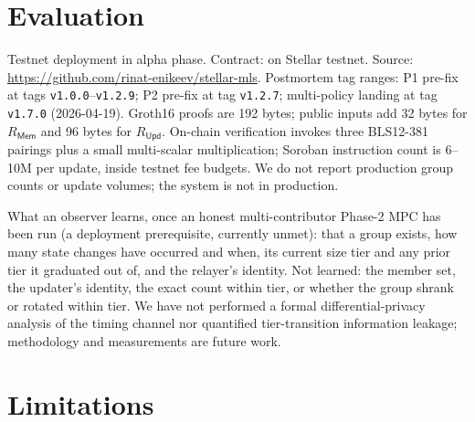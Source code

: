 \documentclass[11pt,a4paper]{article}
\newcommand{\Rmem}{R_{\mathsf{Mem}}}
\newcommand{\Rupd}{R_{\mathsf{Upd}}}
\begin{document}
\section{Evaluation}

Testnet deployment in alpha phase. Contract: \texttt{} on Stellar testnet. Source: \url{https://github.com/rinat-enikeev/stellar-mls}. Postmortem tag ranges: P1 pre-fix at tags \texttt{v1.0.0}--\texttt{v1.2.9}; P2 pre-fix at tag \texttt{v1.2.7}; multi-policy landing at tag \texttt{v1.7.0} (2026-04-19). Groth16 proofs are 192 bytes; public inputs add 32 bytes for $\Rmem$ and 96 bytes for $\Rupd$. On-chain verification invokes three BLS12-381 pairings plus a small multi-scalar multiplication; Soroban instruction count is 6--10M per update, inside testnet fee budgets. We do not report production group counts or update volumes; the system is not in production.

What an observer learns, once an honest multi-contributor Phase-2 MPC has been run (a deployment prerequisite, currently unmet): that a group exists, how many state changes have occurred and when, its current size tier and any prior tier it graduated out of, and the relayer's identity. Not learned: the member set, the updater's identity, the exact count within tier, or whether the group shrank or rotated within tier. We have not performed a formal differential-privacy analysis of the timing channel nor quantified tier-transition information leakage; methodology and measurements are future work.

\section{Limitations}
\label{sec:limitations}
\end{document}
